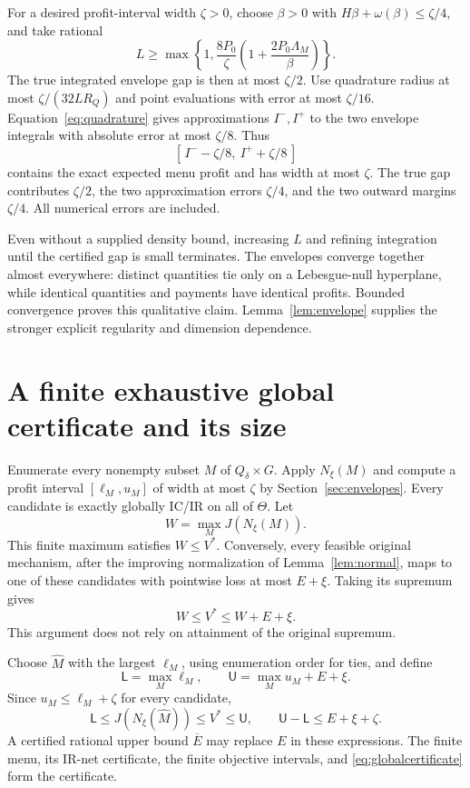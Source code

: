 \documentclass[11pt,a4paper]{article}
\numberwithin{equation}{section}
\begin{document}
For a desired profit-interval width \(\zeta>0\), choose \(\beta>0\)
with \(H\beta+\omega(\beta)\le\zeta/4\), and take rational
\[
 L\ge\max\left\{1,\frac{8P_0}{\zeta}
               \left(1+\frac{2P_0\Lambda_M}{\beta}\right)\right\}.
\]
The true integrated envelope gap is then at most \(\zeta/2\).
Use quadrature radius at most \(\zeta/(32LR_Q)\) and point evaluations
with error at most \(\zeta/16\).
Equation~\eqref{eq:quadrature} gives approximations \(I^-,I^+\) to the
two envelope integrals with absolute error at most \(\zeta/8\).
Thus
\begin{equation}\label{eq:profitinterval}
 [\,I^--\zeta/8,\ I^++\zeta/8\,]
\end{equation}
contains the exact expected menu profit and has width at most \(\zeta\).
The true gap contributes \(\zeta/2\), the two approximation errors
\(\zeta/4\), and the two outward margins \(\zeta/4\).
All numerical errors are included.

Even without a supplied density bound, increasing \(L\) and refining
integration until the certified gap is small terminates.
The envelopes converge together almost everywhere: distinct quantities
tie only on a Lebesgue-null hyperplane, while identical quantities and
payments have identical profits.
Bounded convergence proves this qualitative claim.
Lemma~\ref{lem:envelope} supplies the stronger explicit regularity
and dimension dependence.

\section{A finite exhaustive global certificate and its size}\label{sec:search}
Enumerate every nonempty subset \(M\) of \(Q_\delta\times G\).
Apply \(N_\xi(M)\) and compute a profit interval
\([\ell_M,u_M]\) of width at most \(\zeta\) by
Section~\ref{sec:envelopes}.
Every candidate is exactly globally IC/IR on all of \(\Theta\).
Let
\[
 W=\max_M J(N_\xi(M)).
\]
This finite maximum satisfies \(W\le V^*\).
Conversely, every feasible original mechanism, after the improving
normalization of Lemma~\ref{lem:normal}, maps to one of these candidates
with pointwise loss at most \(E+\xi\).
Taking its supremum gives
\begin{equation}\label{eq:searchbracket}
 W\le V^*\le W+E+\xi.
\end{equation}
This argument does not rely on attainment of the original supremum.

Choose \(\widehat M\) with the largest \(\ell_M\), using enumeration
order for ties, and define
\[
 \mathsf L=\max_M\ell_M,\qquad
 \mathsf U=\max_Mu_M+E+\xi.
\]
Since \(u_M\le\ell_M+\zeta\) for every candidate,
\begin{equation}\label{eq:globalcertificate}
 \mathsf L\le J(N_\xi(\widehat M))\le V^*\le\mathsf U,\qquad
 \mathsf U-\mathsf L\le E+\xi+\zeta.
\end{equation}
A certified rational upper bound \(\overline E\) may replace \(E\)
in these expressions.
The finite menu, its IR-net certificate, the finite objective intervals,
and \eqref{eq:globalcertificate} form the certificate.
\end{document}
